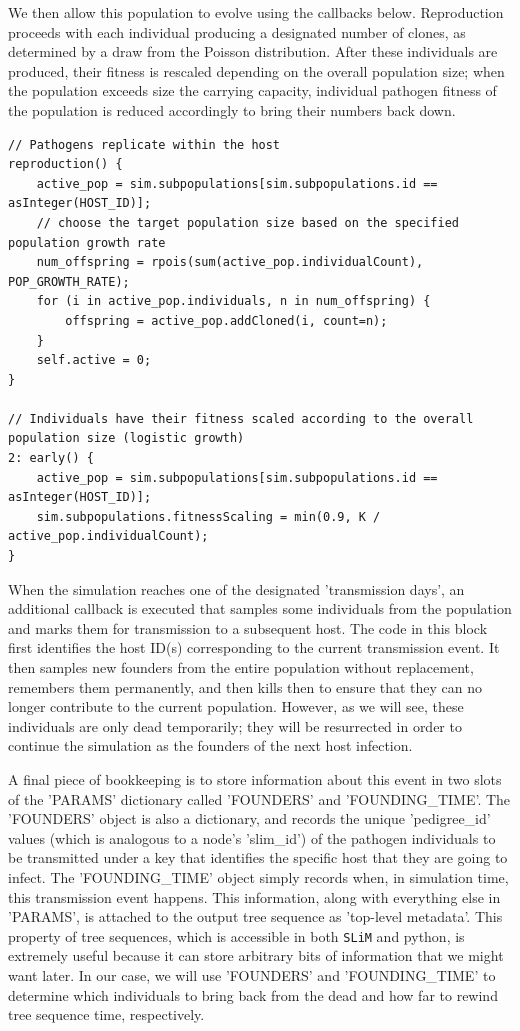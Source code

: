 \documentclass[12pt]{article}
\newcommand{\slim}[0]{\texttt{SLiM}\xspace}
\begin{document}
We then allow this population to evolve using the callbacks below. Reproduction proceeds with each individual producing a designated number of clones, as
determined by a draw from the Poisson distribution. After these individuals are produced, their fitness is rescaled depending on the overall population size; when
the population exceeds size the carrying capacity, individual pathogen fitness of the population is reduced accordingly to bring their numbers back down.

\begin{verbatim}
// Pathogens replicate within the host
reproduction() {
	active_pop = sim.subpopulations[sim.subpopulations.id == asInteger(HOST_ID)];
	// choose the target population size based on the specified population growth rate
	num_offspring = rpois(sum(active_pop.individualCount), POP_GROWTH_RATE);
	for (i in active_pop.individuals, n in num_offspring) {
		offspring = active_pop.addCloned(i, count=n);
	}
	self.active = 0;
}

// Individuals have their fitness scaled according to the overall population size (logistic growth)
2: early() {
	active_pop = sim.subpopulations[sim.subpopulations.id == asInteger(HOST_ID)];
	sim.subpopulations.fitnessScaling = min(0.9, K / active_pop.individualCount);
}
\end{verbatim}

When the simulation reaches one of the designated 'transmission days', an additional callback is executed that samples some individuals from the
population and marks them for transmission to a subsequent host. The code in this block first identifies the host ID(s) corresponding to the current transmission event.
It then samples new founders from the entire population without replacement, remembers them permanently, and then kills then to ensure that they can no longer
contribute to the current population. However, as we will see, these individuals are only dead temporarily; they will be resurrected in order to
continue the simulation as the founders of the next host infection.

 A final piece of bookkeeping is to store information about this event in two slots of the 'PARAMS' dictionary
called 'FOUNDERS' and 'FOUNDING\_TIME'. The 'FOUNDERS' object is also a dictionary, and records the unique 'pedigree\_id' values (which is analogous to a node's 'slim\_id')
of the pathogen individuals to be transmitted under a key that identifies the specific host that they are going to infect. The 'FOUNDING\_TIME' object simply records when, in
simulation time, this transmission event happens. This information, along with everything else in 'PARAMS', is attached to the output tree sequence as 'top-level metadata'. This property
of tree sequences, which is accessible in both \slim and python, is extremely useful because it can store arbitrary bits of information that we might want later. In our case,
we will use 'FOUNDERS' and 'FOUNDING\_TIME' to determine which individuals to bring back from the dead and how far to rewind tree sequence time, respectively.
\end{document}
